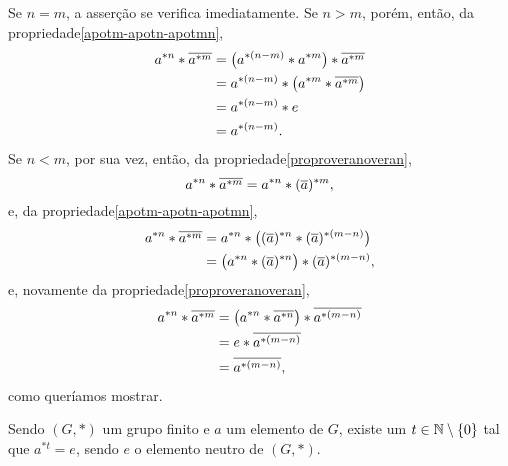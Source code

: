 \begin{dem}
  Se $n=m$, a asserção se verifica imediatamente. Se $n>m$, porém,
  então, da propriedade\xspace\ref{apotm-apotn-apotmn},
  \begin{equation*}
    \begin{aligned}
      a^{\ast n}\ast \overline{a^{\ast m}}
        &= \bigl(a^{\ast (n-m)}\ast a^{\ast m}\bigr)
           \ast\overline{a^{\ast m}}\\
        &= a^{\ast (n-m)}\ast\bigl(a^{\ast m}\ast
           \overline{a^{\ast m}}\bigr)\\
        &= a^{\ast (n-m)}\ast e\\
        &= a^{\ast (n-m)}\mathrm{.}
    \end{aligned}
  \end{equation*}
  Se $n<m$, por sua vez, então, da
  propriedade\xspace\ref{proproveranoveran},
  \begin{equation*}
    a^{\ast n}\ast \overline{a^{\ast m}}
    = a^{\ast n}\ast(\overline{a})^{\ast m}\mathrm{,}
  \end{equation*}
  e, da propriedade\xspace\ref{apotm-apotn-apotmn},
  \begin{equation*}
    \begin{aligned}
      a^{\ast n}\ast \overline{a^{\ast m}}
      &= a^{\ast n}\ast
         \bigl(
         (\overline{a})^{\ast n}\ast (\overline{a})^{\ast (m-n)}
         \bigr)\\
      &= \bigl(a^{\ast n}\ast (\overline{a})^{\ast n}\bigr)
         \ast (\overline{a})^{\ast (m-n)}\mathrm{,}
    \end{aligned}
  \end{equation*}
  e, novamente da propriedade\xspace\ref{proproveranoveran},
  \begin{equation*}
    \begin{aligned}
      a^{\ast n}\ast \overline{a^{\ast m}} &=
        \bigl(a^{\ast n}\ast \overline{a^{\ast n}}\bigr)
        \ast \overline{a^{\ast (m-n)}}\\&=
        e\ast \overline{a^{\ast (m-n)}}\\&=
        \overline{a^{\ast (m-n)}}\mathrm{,}
    \end{aligned}
  \end{equation*}
  como queríamos mostrar.
\end{dem}

\begin{Lem}\label{lemate}
  Sendo $(G,\ast)$ um grupo finito
  e $a$ um elemento de $G$, existe um $t\in\mathbb{N}\setminus\left\{ 0 \right\}$ tal que
  $a^{\ast t} = e$, sendo $e$ o elemento neutro de $(G,\ast)$.
\end{Lem}

